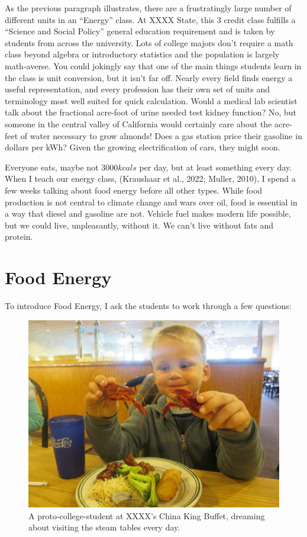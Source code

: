 \documentclass[man]{apa7}
\begin{document}
As the previous paragraph illustrates, there are a frustratingly large number of different units in an ``Energy'' class.  At 
XXXX
State, this 3 credit class fulfills a ``Science and Social Policy'' general education requirement and is taken by students from across the university.   Lots of college majors don't require a math class beyond algebra or introductory statistics and the population is largely math-averse. You could jokingly say that one of the main things students learn in the class is unit conversion, but it isn't far off.  Nearly every field finds energy a useful representation, and every profession has their own set of units and terminology most well suited for quick calculation.  Would a medical lab scientist talk about the fractional acre-foot of urine needed test kidney function?  No, but someone in the central valley of California would certainly care about the acre-feet of water necessary to grow almonds!  Does a gas station price their gasoline in dollars per kWh? Given the growing electrification of cars, they might soon.

Everyone eats, maybe not $3000 kcals$ per day, but at least something every day.  When I teach our energy class, (Kraushaar et al., 2022; Muller, 2010),
I spend a few weeks talking about food energy before all other types.  While food production is not central to climate change and wars over oil, food is essential in a way that diesel and gasoline are not.  Vehicle fuel makes modern life possible, but we could live, unpleasantly, without it.  We can't live without fats and protein.  

\section{Food Energy}

To introduce Food Energy, I ask the students to work through a few questions:

\begin{figure}[h]
\centering
\includegraphics[width=\columnwidth]{at_the_buffet.jpg}
\caption{
A proto-college-student at 
XXXX's
China King Buffet, dreaming about visiting the steam tables every day. 
}
\label{buffet}
\end{figure}
\end{document}

